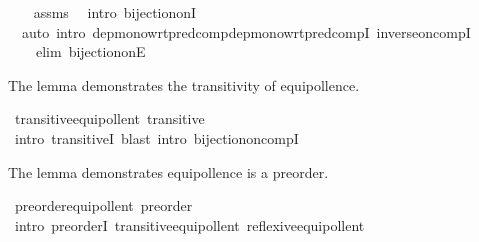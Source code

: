 \begin{isabellebody}
%
\isadelimproof
\ \ %
\endisadelimproof
%
\isatagproof
{}\isamarkupfalse%
\ assms\ \isamarkupfalse%
\ {\isacharparenleft}{\kern0pt}intro\ bijection{\isacharunderscore}{\kern0pt}onI{\isacharparenright}{\kern0pt}\isanewline
\ \ {\isacharparenleft}{\kern0pt}auto\ intro{\isacharcolon}{\kern0pt}\ dep{\isacharunderscore}{\kern0pt}mono{\isacharunderscore}{\kern0pt}wrt{\isacharunderscore}{\kern0pt}pred{\isacharunderscore}{\kern0pt}comp{\isacharunderscore}{\kern0pt}dep{\isacharunderscore}{\kern0pt}mono{\isacharunderscore}{\kern0pt}wrt{\isacharunderscore}{\kern0pt}pred{\isacharunderscore}{\kern0pt}compI{\isacharprime}{\kern0pt}\ inverse{\isacharunderscore}{\kern0pt}on{\isacharunderscore}{\kern0pt}compI\isanewline
\ \ \ \ elim{\isacharbang}{\kern0pt}{\isacharcolon}{\kern0pt}\ bijection{\isacharunderscore}{\kern0pt}onE{\isacharparenright}{\kern0pt}%
\endisatagproof
{\isafoldproof}%
%
\isadelimproof
%
\endisadelimproof
%
\begin{isamarkuptext}%
The lemma demonstrates the transitivity of equipollence.%
\end{isamarkuptext}\isamarkuptrue%
\isamarkupfalse%
\ transitive{\isacharunderscore}{\kern0pt}equipollent{\isacharcolon}{\kern0pt}\ {\isachardoublequoteopen}transitive\ {\isacharparenleft}{\kern0pt}{\isasymapprox}{\isacharparenright}{\kern0pt}{\isachardoublequoteclose}\isanewline
%
\isadelimproof
\ \ %
\endisadelimproof
%
\isatagproof
{}\isamarkupfalse%
\ {\isacharparenleft}{\kern0pt}intro\ transitiveI{\isacharparenright}{\kern0pt}\ {\isacharparenleft}{\kern0pt}blast\ intro{\isacharcolon}{\kern0pt}\ bijection{\isacharunderscore}{\kern0pt}on{\isacharunderscore}{\kern0pt}compI{\isacharparenright}{\kern0pt}%
\endisatagproof
{\isafoldproof}%
%
\isadelimproof
%
\endisadelimproof
%
\begin{isamarkuptext}%
The lemma demonstrates equipollence is a preorder.%
\end{isamarkuptext}\isamarkuptrue%
\isamarkupfalse%
\ preorder{\isacharunderscore}{\kern0pt}equipollent{\isacharcolon}{\kern0pt}\ {\isachardoublequoteopen}preorder\ {\isacharparenleft}{\kern0pt}{\isasymapprox}{\isacharparenright}{\kern0pt}{\isachardoublequoteclose}\isanewline
%
\isadelimproof
\ \ %
\endisadelimproof
%
\isatagproof
{}\isamarkupfalse%
\ {\isacharparenleft}{\kern0pt}intro\ preorderI\ transitive{\isacharunderscore}{\kern0pt}equipollent\ reflexive{\isacharunderscore}{\kern0pt}equipollent{\isacharparenright}{\kern0pt}%
\endisatagproof
{\isafoldproof}%
%
\isadelimproof

\end{isabellebody}
